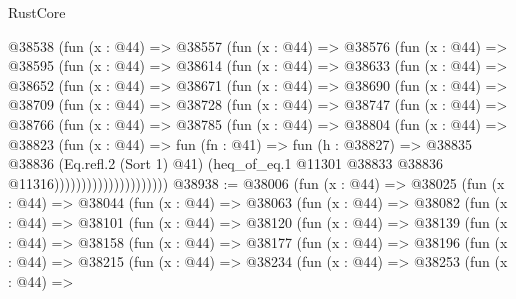 \begin{lexlean}{RustCore}
\begin{coremodule}
          @38538
            (fun (x : @44) =>
            @38557
              (fun (x : @44) =>
              @38576
                (fun (x : @44) =>
                @38595
                  (fun (x : @44) =>
                  @38614
                    (fun (x : @44) =>
                    @38633
                      (fun (x : @44) =>
                      @38652
                        (fun (x : @44) =>
                        @38671
                          (fun (x : @44) =>
                          @38690
                            (fun (x : @44) =>
                            @38709
                              (fun (x : @44) =>
                              @38728
                                (fun (x : @44) =>
                                @38747
                                  (fun (x : @44) =>
                                  @38766
                                    (fun (x : @44) =>
                                    @38785
                                      (fun (x : @44) =>
                                      @38804
                                        (fun (x : @44) =>
                                        @38823
                                          (fun (x : @44) =>
                                          fun (fn : @41) =>
                                          fun (h : @38827) =>
                                          @38835
                                            @38836
                                            (Eq.refl.{2} (Sort 1) @41)
                                            (heq_of_eq.{1}
                                              @11301
                                              @38833
                                              @38836
                                              @11316)))))))))))))))))))))
@38938 := @38006
    (fun (x : @44) =>
    @38025
      (fun (x : @44) =>
      @38044
        (fun (x : @44) =>
        @38063
          (fun (x : @44) =>
          @38082
            (fun (x : @44) =>
            @38101
              (fun (x : @44) =>
              @38120
                (fun (x : @44) =>
                @38139
                  (fun (x : @44) =>
                  @38158
                    (fun (x : @44) =>
                    @38177
                      (fun (x : @44) =>
                      @38196
                        (fun (x : @44) =>
                        @38215
                          (fun (x : @44) =>
                          @38234
                            (fun (x : @44) =>
                            @38253
                              (fun (x : @44) =>

\end{coremodule}
\end{lexlean}
